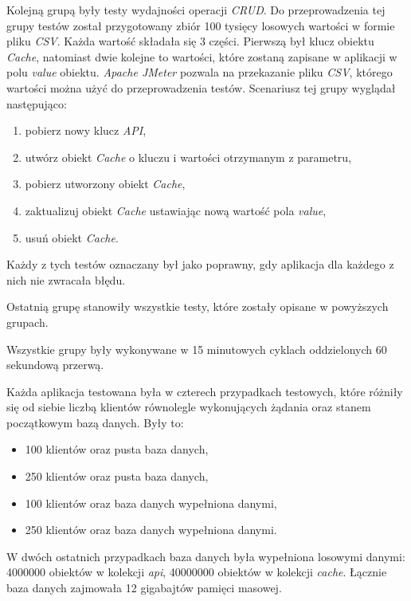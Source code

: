 Kolejną grupą były testy wydajności operacji \textsl{CRUD}. Do przeprowadzenia tej grupy testów został przygotowany zbiór 100 tysięcy losowych wartości w formie pliku \textsl{CSV}. Każda wartość składała się 3 części. Pierwszą był klucz obiektu \textsl{Cache}, natomiast dwie kolejne to wartości, które zostaną zapisane w aplikacji w polu \textsl{value} obiektu. \textsl{Apache JMeter} pozwala na przekazanie pliku \textsl{CSV}, którego wartości można użyć do przeprowadzenia testów. 
Scenariusz tej grupy wyglądał następująco:

\begin{enumerate}
    \item pobierz nowy klucz \textsl{API},
    \item utwórz obiekt \textsl{Cache} o kluczu i wartości otrzymanym z parametru,
    \item pobierz utworzony obiekt \textsl{Cache}, 
    \item zaktualizuj obiekt \textsl{Cache} ustawiając nową wartość pola \textsl{value},
    \item usuń obiekt \textsl{Cache}.
\end{enumerate}
Każdy z tych testów oznaczany był jako poprawny, gdy aplikacja dla każdego z nich nie zwracała błędu.

Ostatnią grupę stanowiły wszystkie testy, które zostały opisane w powyższych grupach. 

Wszystkie grupy były wykonywane w 15 minutowych cyklach oddzielonych 60 sekundową przerwą.

Każda aplikacja testowana była w czterech przypadkach testowych, które różniły się od siebie liczbą klientów równolegle wykonujących żądania oraz stanem początkowym bazą danych. Były to:
\begin{itemize}
    \item 100 klientów oraz pusta baza danych,
    \item 250 klientów oraz pusta baza danych,
    \item 100 klientów oraz baza danych wypełniona danymi,
    \item 250 klientów oraz baza danych wypełniona danymi.
\end{itemize}
W dwóch ostatnich przypadkach baza danych była wypełniona losowymi danymi: 4000000 obiektów w kolekcji \textsl{api}, 40000000 obiektów w kolekcji \textsl{cache}. Łącznie baza danych zajmowała 12 gigabajtów pamięci masowej.

